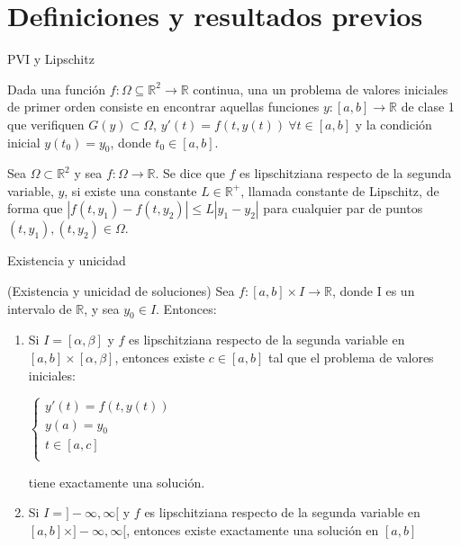 \section{Definiciones y resultados previos}
		\begin{frame}{PVI y Lipschitz}
			\begin{definition} 
				Dada una función $f:\Omega \subseteq \mathbb R^2  \to \mathbb{R}$ continua, una un problema de valores iniciales de primer orden consiste en encontrar aquellas funciones $y: [a,b] \rightarrow \mathbb{R}$ de clase 1 que verifiquen $G(y) \subset \Omega$, $y'(t) = f(t,y(t)) \ \forall t \in [a,b]$ y la condición inicial $y(t_0) = y_0$, donde $t_0 \in [a,b]$.  
			\end{definition}
		
			\begin{definition}
				Sea $\Omega \subset \mathbb{R}^2$ y sea $f : \Omega \rightarrow \mathbb{R}$. Se dice que $f$ es lipschitziana respecto de la segunda variable, $y$, si existe una constante $L \in \mathbb{R^{+}}$, llamada constante de Lipschitz, de forma que $|f(t,y_1) - f(t, y_2)| \le L|y_1 - y_2|$ para cualquier par de puntos $(t,y_1), (t,y_2) \in \Omega$.  
			\end{definition}
		\end{frame}
	


		\begin{frame}{Existencia y unicidad}
			\fontsize{11}{11}\selectfont
			\begin{theorem} \label{theorem:existence-uniqueness}
				(Existencia y unicidad de soluciones) Sea $f: [a,b] \times I \rightarrow \mathbb{R}$, donde I es un intervalo de $\mathbb{R}$, y sea $y_0 \in I$. Entonces:
				\begin{enumerate}
					\item Si $I = [\alpha,\beta]$ y $f$ es lipschitziana respecto de la segunda variable en $[a,b]\times[\alpha,\beta]$, entonces existe $c \in [a,b]$ tal que el problema de valores iniciales:
					\begin{center}
						$\begin{cases}
						y'(t) = f(t,y(t)) \\
						y(a) = y_0 \\
						t \in [a,c] \\
						\end{cases}$
					\end{center}
					tiene exactamente una solución.
					\item Si $I = ]-\infty,\infty[$ y $f$ es lipschitziana respecto de la segunda variable en $[a,b]\times]-\infty,\infty[$, entonces existe exactamente una solución en $[a,b]$
				\end{enumerate}
			\end{theorem}
		\end{frame}	
			
